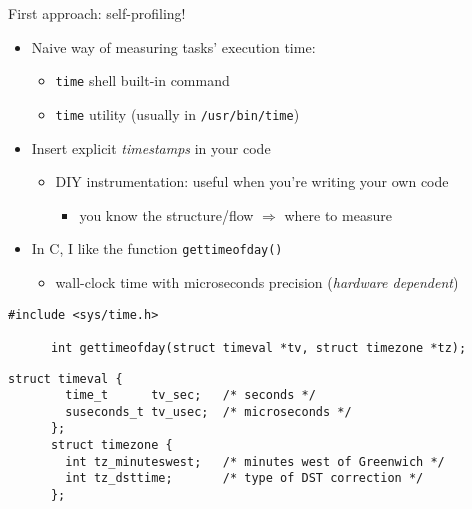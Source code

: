 \documentclass[10pt,xcolor=table]{beamer}
\begin{document}
\begin{frame}[fragile]{First approach: self-profiling!}

  \begin{itemize}
  \item Naive way of measuring tasks' execution time:
    \begin{itemize}
    \item {\tt time} shell built-in command
    \item {\tt time} utility (usually in {\tt /usr/bin/time})
    \end{itemize}

    \pause

  \item Insert explicit \emph{timestamps} in your code
    \begin{itemize}
    \item DIY instrumentation: useful when you're writing your own code
      \begin{itemize}
      \item you know the structure/flow $\Rightarrow$ where to measure
      \end{itemize}
    \end{itemize}

    \pause

  \item In C, I like the function {\tt gettimeofday()}
    \begin{itemize}
    \item wall-clock time with microseconds precision ({\it hardware
        dependent})
    \end{itemize}
  \end{itemize}

  \vspace*{-0.35cm}
  \begin{overprint}
    \begin{lstlisting}[style=c,gobble=3]
      #include <sys/time.h>

      int gettimeofday(struct timeval *tv, struct timezone *tz);
    \end{lstlisting}
    \vspace*{-0.2cm}
    \begin{lstlisting}[style=c,gobble=3]
      struct timeval {
        time_t      tv_sec;   /* seconds */
        suseconds_t tv_usec;  /* microseconds */
      };
      struct timezone {
        int tz_minuteswest;   /* minutes west of Greenwich */
        int tz_dsttime;       /* type of DST correction */
      };
    \end{lstlisting}


\end{overprint}
\end{frame}
\end{document}
